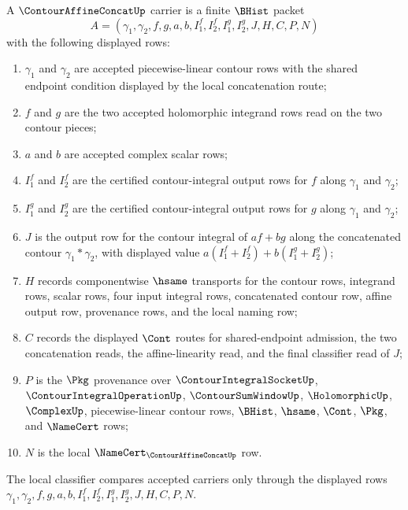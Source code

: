 \begin{definition}
\label{def:contour-affine-concat-carrier}
A $\ContourAffineConcatUp$ carrier is a finite $\BHist$ packet
$$
A=(\gamma_1,\gamma_2,f,g,a,b,I_1^f,I_2^f,I_1^g,I_2^g,J,H,C,P,N)
$$
with the following displayed rows:
\begin{enumerate}
\item $\gamma_1$ and $\gamma_2$ are accepted piecewise-linear contour rows with the shared endpoint condition displayed by the local concatenation route;
\item $f$ and $g$ are the two accepted holomorphic integrand rows read on the two contour pieces;
\item $a$ and $b$ are accepted complex scalar rows;
\item $I_1^f$ and $I_2^f$ are the certified contour-integral output rows for $f$ along $\gamma_1$ and $\gamma_2$;
\item $I_1^g$ and $I_2^g$ are the certified contour-integral output rows for $g$ along $\gamma_1$ and $\gamma_2$;
\item $J$ is the output row for the contour integral of $a f+b g$ along the concatenated contour $\gamma_1\ast\gamma_2$, with displayed value $a(I_1^f+I_2^f)+b(I_1^g+I_2^g)$;
\item $H$ records componentwise $\hsame$ transports for the contour rows, integrand rows, scalar rows, four input integral rows, concatenated contour row, affine output row, provenance rows, and the local naming row;
\item $C$ records the displayed $\Cont$ routes for shared-endpoint admission, the two concatenation reads, the affine-linearity read, and the final classifier read of $J$;
\item $P$ is the $\Pkg$ provenance over $\ContourIntegralSocketUp$, $\ContourIntegralOperationUp$, $\ContourSumWindowUp$, $\HolomorphicUp$, $\ComplexUp$, piecewise-linear contour rows, $\BHist$, $\hsame$, $\Cont$, $\Pkg$, and $\NameCert$ rows;
\item $N$ is the local $\NameCert_{\ContourAffineConcatUp}$ row.
\end{enumerate}
The local classifier compares accepted carriers only through the displayed rows $\gamma_1,\gamma_2,f,g,a,b,I_1^f,I_2^f,I_1^g,I_2^g,J,H,C,P,N$.
\end{definition}

